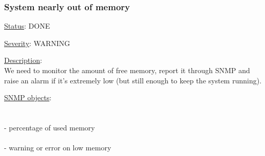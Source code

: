 \subsubsection{\bf System nearly out of memory}
		\label{fail:other:no_mem}
		\begin{pck_descr}
			\item [] \underline{Status}: DONE
			\item [] \underline{Severity}: WARNING
			\item [] \underline{Description}:\\
				We need to monitor the amount of free memory, report it through SNMP and
				raise an alarm if it's extremely low (but still enough to keep the
				system running).
			\item [] \underline{SNMP objects}:\\
				\\
				\\
				 - percentage of used memory\\
				\\
				 - warning or error on low memory\\
				\\
		\end{pck_descr}
